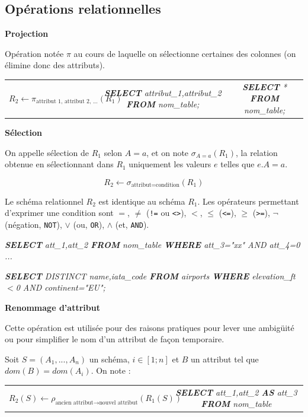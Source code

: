 \documentclass[10pt,fleqn]{article} %
\begin{document}
\subsection*{Opérations relationnelles}

\begin{defi}
\textbf{Projection}

Opération notée $\pi$ au cours de laquelle on sélectionne certaines des colonnes (on élimine donc des attributs). 
\begin{tabular}{ccc}
$
 R_2 \leftarrow \pi_{\text{attribut 1, attribut 2, ...}}(R_1)
$
& 
\textsl{\textbf{SELECT} attribut\_1,attribut\_2 \textbf{FROM} nom\_table;}
&
\textsl{\textbf{SELECT} * \textbf{FROM} nom\_table;}
\end{tabular}
\end{defi}




\begin{defi}
\textbf{Sélection}

On appelle sélection de $R_1$ selon $A=a$, et on note $\sigma_{A=a}(R_1)$, la relation obtenue en sélectionnant dans $R_1$ uniquement les valeurs $e$ telles que $e.A = a$.


$$
R_2 \leftarrow \sigma_{\text{attribut}=\text{condition}}(R_1)
$$


Le schéma relationnel $R_2$ est identique au schéma $R_1$.  Les opérateurs permettant d'exprimer une condition sont $=$, $\neq$ (\texttt{!=} ou \texttt{<>}), $<$, $\leq$ (\texttt{<=}), $\geq$ (\texttt{>=}), $\neg$ (négation, \texttt{NOT}), $\vee$ (ou, \texttt{OR}), $\wedge$ (et, \texttt{AND}).


\textsl{\textbf{SELECT} att\_1,att\_2 \textbf{FROM} nom\_table \textbf{WHERE} att\_3="xx" AND att\_4=0 ...}

\textsl{\textbf{SELECT} DISTINCT name,iata\_code \textbf{FROM} airports \textbf{WHERE} elevation\_ft$<$0 AND continent="EU";}
\end{defi}





\begin{defi}
\textbf{Renommage d'attribut}

Cette opération est utilisée pour des raisons pratiques pour lever une ambigüité ou pour simplifier le nom d'un attribut de façon temporaire. 

Soit $S = (A_1,... ,A_n)$ un schéma, $ i \in[1;n]$ et $B$ un attribut tel que
$dom(B) = dom(A_i)$. On note :

\begin{center}
\begin{tabular}{cc}
$R_2 (S)\leftarrow \rho_{\text{ancien attribut} \rightarrow \text{nouvel attribut}}(R_1(S))$ & 
\textsl{\textbf{SELECT} att\_1,att\_2 \textbf{AS} att\_3 \textbf{FROM} nom\_table}\\
\end{tabular}
\end{center}

\end{defi}
\end{document}

